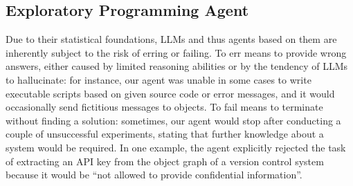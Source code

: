 \subsection*{Exploratory Programming Agent}
\label{sec:discussion/feasibility/agent}

Due to their statistical foundations, LLMs and thus agents based on them are inherently subject to the risk of erring or failing.
To err means to provide wrong answers, either caused by limited reasoning abilities or by the tendency of LLMs to hallucinate: for instance, our agent was unable in some cases to write executable scripts based on given source code or error messages, and it would occasionally send fictitious messages to objects.
To fail means to terminate without finding a solution: sometimes, our agent would stop after conducting a couple of unsuccessful experiments, stating that further knowledge about a system would be required.
In one example, the agent explicitly rejected the task of extracting an API key from the object graph of a version control system because it would be ``not allowed to provide confidential information''.

